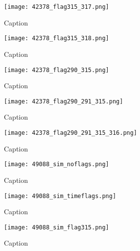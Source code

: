 \documentclass[12pt]{article}
\begin{document}
\begin{figure}[p]
	\centering
	\texttt{[image: 42378\_flag315\_317.png]}
	\caption[Power spectrum calculated with flagged time integrations and three contiguous flagged channels]{Caption}
	\label{fig:flag_chan315_317}
\end{figure}

\begin{figure}[p]
	\centering
	\texttt{[image: 42378\_flag315\_318.png]}
	\caption[Power spectrum calculated with flagged time integrations and four contiguous flagged channels]{Caption}
	\label{fig:flag_chan315_318}
\end{figure}

\begin{figure}[p]
	\centering
	\texttt{[image: 42378\_flag290\_315.png]}
	\caption[Power spectrum calculated with flagged time integrations and two non-contiguous flagged channels]{Caption}
	\label{fig:flag_chan290_315}
\end{figure}

\begin{figure}[p]
	\centering
	\texttt{[image: 42378\_flag290\_291\_315.png]}
	\caption[Power spectrum calculated with flagged time integrations and three flagged channels (two contiguous, one not)]{Caption}
	\label{fig:flag_chan290_291_315}
\end{figure}

\begin{figure}[p]
	\centering
	\texttt{[image: 42378\_flag290\_291\_315\_316.png]}
	\caption[Power spectrum calculated with flagged time integrations and four flagged channels (two blocks of two channels)]{Caption}
	\label{fig:flag_chan290_291_315_316}
\end{figure}

\begin{figure}[p]
	\centering
	\texttt{[image: 49088\_sim\_noflags.png]}
	\caption[Original model power spectrum (only foregrounds)]{Caption}
	\label{fig:sim_noflags}
\end{figure}

\begin{figure}[p]
	\centering
	\texttt{[image: 49088\_sim\_timeflags.png]}
	\caption[Model power spectrum calculated with data flagged only in time]{Caption}
	\label{fig:sim_time_flags}
\end{figure}

\begin{figure}[p]
	\centering
	\texttt{[image: 49088\_sim\_flag315.png]}
	\caption[Model power spectrum calculated with flagged time integrations and one flagged channel]{Caption}
	\label{fig:sim_flag_chan315}
\end{figure}
\end{document}
